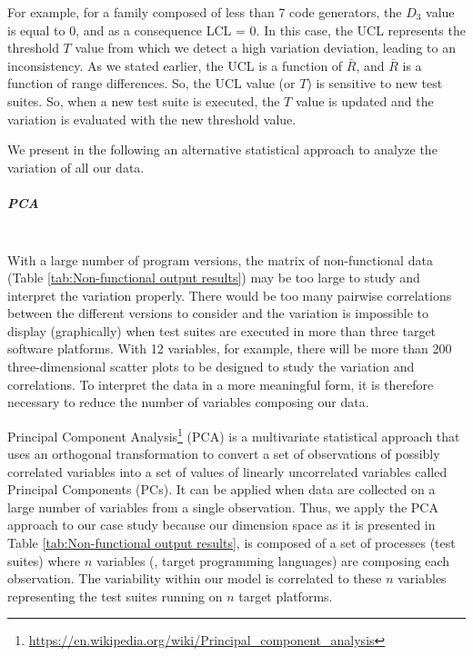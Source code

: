 For example, for a family composed of less than 7 code generators, the $D_{3}$ value is equal to $0$, and as a consequence LCL = $0$. In this case, the UCL represents the threshold $T$ value from which we detect a high variation deviation, leading to an inconsistency. As we stated earlier, the UCL is a function of $\bar{R}$, and $\bar{R}$ is a function of range differences. So, the UCL value (or $T$) is sensitive to new test suites. So, when a new test suite is executed, the $T$ value is updated and the variation is evaluated with the new threshold value. 

We present in the following an alternative statistical approach to analyze the variation of all our data.


\subparagraph{PCA}~\\
With a large number of program versions, the matrix of non-functional data (Table \ref{tab:Non-functional output results}) may be too large to study and interpret the variation properly. There would be too many pairwise correlations between the different versions to consider and the variation is impossible to display (graphically) when test suites are executed in more than three target software platforms.
With 12 variables, for example, there will be more than 200 three-dimensional scatter plots to be designed to study the variation and correlations.
To interpret the data in a more meaningful form, it is therefore necessary to reduce the number of variables composing our data.

Principal Component Analysis\footnote{\url{https://en.wikipedia.org/wiki/Principal_component_analysis}} (PCA) is a multivariate statistical approach that uses an orthogonal transformation to convert a set of observations of possibly correlated variables into a set of values of linearly uncorrelated variables called Principal Components (PCs). It can be applied when data are collected on a large number of variables from a single observation. Thus, we apply the PCA approach to our case study because our dimension space as it is presented in Table \ref{tab:Non-functional output results}, is composed of a set of processes (test suites) where $n$ variables (\eg, target programming languages) are composing each observation. The variability within our model is correlated to these $n$ variables representing the test suites running on $n$ target platforms. 

